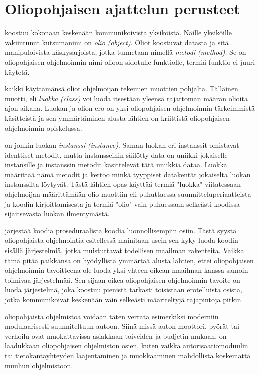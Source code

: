 \documentclass{tufte-book}
\newcommand{\eng}[1]{\textit{(#1)}}
\newcommand{\new}[1]{\textit{\gls{#1}}}
\newcommand{\neweng}[2]{\new{#1} \eng{#2}}
\begin{document}

\section{Oliopohjaisen ajattelun perusteet}

 koostuu kokonaan keskenään kommunikoivista yksiköistä.
Näille yksiköille vakiintunut kutsumanimi on \neweng{olio}{object}. Oliot koostuvat datasta ja
sitä manipuloivista käskysarjoista, jotka tunnetaan nimellä \neweng{metodi}{method}. Se on
oliopohjaisen ohjelmoinnin nimi olioon sidotulle funktiolle, termiä \gls{funktio} ei juuri
käytetä.

 kaikki käyttämänsä oliot ohjelmoijan tekemien muottien pohjalta.
Tälläinen muotti, eli \neweng{luokka}{class} voi luoda itsestään yleensä rajattoman määrän olioita
ajon aikana. Luokan ja olion ero on yksi oliopohjaisen ohjelmoinnin tärkeimmistä käsitteistä ja
sen ymmärtäminen alusta lähtien on kriittistä oliopohjaisen ohjelmoinnin opiskelussa.

 on jonkin luokan \neweng{instanssi}{instance}. Saman luokan eri
instanssit omistavat identtiset metodit, mutta instansseihin säilötty data on uniikki jokaiselle
instansille ja instanssin metodit käsittelevät tätä uniikkia dataa. Luokka määrittää nämä metodit
ja kertoo minkä tyyppiset datakentät jokaiselta luokan instanssilta löytyvät. Tästä lähtien
opas käyttää termiä "luokka" viitatessaan ohjelmoijan määrittämään olio muottiin eli puhuttaessa
suunnitteluperiaatteista ja koodin kirjoittamisesta ja termiä "olio" vain puhuessaan selkeästi
koodissa sijaitsevasta luokan ilmentymästä.

 järjestää koodia proseduraalista koodia luonnollisempiin osiin.
Tästä syystä oliopohjaista ohjelmointia esitellessä mainitaan usein sen kyky luoda koodin sisällä
järjestelmiä, jotka muistuttavat todellisen maailman rakenteita. Vaikka tämä pitää paikkansa on
hyödyllistä ymmärtää alusta lähtien, ettei oliopohjaisen ohjelmoinnin tavoitteena ole luoda yksi
yhteen oikean maailman kanssa samoin toimivaa järjestelmää. Sen sijaan oikea oliopohjaisen
ohjelmoinnin tavoite on luoda järjestelmä, joka koostuu pienistä tarkasti toisistaan erotelluista
osista, jotka kommunikoivat keskenään vain selkeästi määriteltyjä rajapintoja pitkin.

 oliopohjaista ohjelmistoa voidaan täten verrata esimerkiksi
moderniin modulaarisesti suunniteltuun autoon. Siinä missä auton moottori, pyörät tai verhoilu
ovat muokattavissa asiakkaan toiveiden ja budjetin mukaan, on laadukkaan oliopohjaisen ohjelmiston
osien, kuten vaikka autorisaatiomoduulin tai tietokantayhteyden laajentaminen ja muokkaaminen
mahdollista koskematta muuhun ohjelmistoon.
\end{document}
